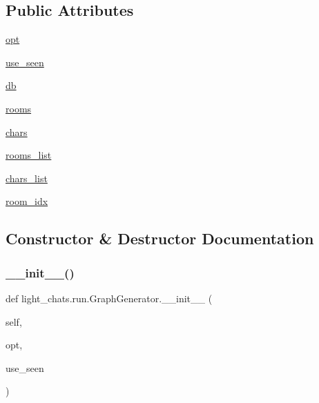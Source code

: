 \subsection*{Public Attributes}
\begin{DoxyCompactItemize}
\item 
\hyperlink{classlight__chats_1_1run_1_1GraphGenerator_a3060edf4bd46a5e1a78dbc48f539d341}{opt}
\item 
\hyperlink{classlight__chats_1_1run_1_1GraphGenerator_a81da652d9cbc091fba5d410630750c39}{use\+\_\+seen}
\item 
\hyperlink{classlight__chats_1_1run_1_1GraphGenerator_a0c0a9acbec3d441069dc15d78ed357fc}{db}
\item 
\hyperlink{classlight__chats_1_1run_1_1GraphGenerator_aff14ffc413151e1665e23759d5f20667}{rooms}
\item 
\hyperlink{classlight__chats_1_1run_1_1GraphGenerator_a3a7d4254e7381805d70735c33110e488}{chars}
\item 
\hyperlink{classlight__chats_1_1run_1_1GraphGenerator_a8e98e856aa61d7d4a07ab4e212cec333}{rooms\+\_\+list}
\item 
\hyperlink{classlight__chats_1_1run_1_1GraphGenerator_adb64c1437325f8797b0d6a7cdd9d6692}{chars\+\_\+list}
\item 
\hyperlink{classlight__chats_1_1run_1_1GraphGenerator_aeaacf5bfa9cccecca2e21a91d5b3a9ce}{room\+\_\+idx}
\end{DoxyCompactItemize}


\subsection{Constructor \& Destructor Documentation}
\mbox{\label{classlight__chats_1_1run_1_1GraphGenerator_aac2b7559d6b74c923297239c810ed53f}} 
\subsubsection{\texorpdfstring{\+\_\+\+\_\+init\+\_\+\+\_\+()}{\_\_init\_\_()}}
{\footnotesize\ttfamily def light\+\_\+chats.\+run.\+Graph\+Generator.\+\_\+\+\_\+init\+\_\+\+\_\+ (\begin{DoxyParamCaption}\item[{}]{self,  }\item[{}]{opt,  }\item[{}]{use\+\_\+seen }\end{DoxyParamCaption})}



